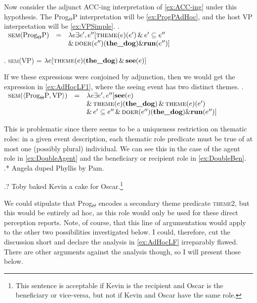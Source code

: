 \documentclass[MilwayThesis]{subfiles}
\begin{document}
Now consider the adjunct ACC-ing interpretation of \cref{ex:ACC-ing} under this hypothesis.
The Prog$_{\Theta}$P interpretation will be \cref{ex:ProgPAdHoc}, and the host VP interpretation will be \cref{ex:VPSimple}.
\ex.\label{ex:ProgPAdHoc} $
\begin{array}[t]{rcl}
	\textsc{sem}(\text{Prog}_{\Theta}\text{P}) &=& \lambda e \exists e^{\prime},e^{\prime\prime}[\textsc{theme}(e)(e^{\prime}) \,\&\, e^{\prime}\subseteq e^{\prime\prime}\\
	& & \&\, \textsc{doer}(e^{\prime\prime})(\textbf{the\_dog}) \& \textbf{run}(e^{\prime\prime})]
\end{array}
$

\ex.\label{ex:VPSimple} \textsc{sem}(VP) = $\lambda e [\textsc{theme}(e)(\textbf{the\_dog}) \,\&\, \textbf{see}(e)]$

If we these expressions were conjoined by adjunction, then we would get the expression in \cref{ex:AdHocLF1}, where the seeing event has two distinct themes.
\ex.\label{ex:AdHocLF1} $
\begin{array}[t]{rcl}
	\textsc{sem}(\langle \text{Prog}_{\Theta}\text{P}, \text{VP}\rangle) &=& \lambda e\exists e^{\prime},e^{\prime\prime}[\textbf{see}(e)\\
		& & \&\, \textsc{theme}(e)(\textbf{the\_dog}) \,\&\, \textsc{theme}(e)(e^{\prime})\\
	& & \&\, e^{\prime}\subseteq e^{\prime\prime} \,\&\, \textsc{doer}(e^{\prime\prime})(\textbf{the\_dog}) \& \textbf{run}(e^{\prime\prime})]
\end{array}
$

This is problematic since there seems to be a uniqueness restriction on thematic roles: in a given event description, each thematic role predicate must be true of at most one (possibly plural) individual.
We can see this in the case of the agent role in \cref{ex:DoubleAgent} and the beneficiary or recipient role in \cref{ex:DoubleBen}.
\ex.* \label{ex:DoubleAgent} Angela duped Phyllis by Pam.

\ex.? \label{ex:DoubleBen} Toby baked Kevin a cake for Oscar.\footnote{
	This sentence is acceptable if Kevin is the recipient and Oscar is the beneficiary or vice-versa, but not if Kevin and Oscar have the same role.
}

We could stipulate that Prog$_{\Theta}$ encodes a secondary theme predicate \textsc{theme2}, but this would be entirely ad hoc, as this role would only be used for these direct perception reports.
Note, of course, that this line of argumentation would apply to the other two possibilities investigated below.
I could, therefore, cut the discussion short and declare the analysis in \cref{ex:AdHocLF} irreparably flawed.
There are other arguments against the analysis though, so I will present those below.
\end{document}
